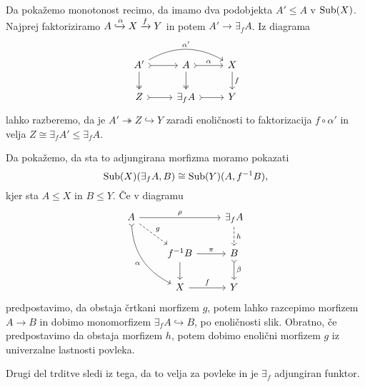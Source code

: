 \documentclass[../kategoricna_logika.tex]{subfiles}
\begin{document}
\begin{dokaz}
  Da pokažemo monotonost recimo, da imamo dva podobjekta $A' \leq A$ v
  $\operatorname{Sub}(X)$.  Najprej faktoriziramo
  $A \xhookrightarrow{\alpha} X \xrightarrow{f} Y$ in potem
  $A' \to \exists_f A$.  Iz diagrama
  \begin{equation*}
    \begin{tikzcd}
      A' \ar[d, two heads] \ar[r, tail] \ar[rr, bend left, "\alpha'"]
      &
      A \ar[d, two heads] \ar[r, tail, "\alpha"] & X \ar[d, "f"] \\
      Z \ar[r, tail] & \exists_f A \ar[r, tail] & Y
    \end{tikzcd}
  \end{equation*}
  lahko razberemo, da je $A' \twoheadrightarrow Z \hookrightarrow Y$
  zaradi enoličnosti to faktorizacija $f \circ \alpha'$ in velja
  $Z \cong \exists_f A' \leq \exists_f A$.

  Da pokažemo, da sta to adjungirana morfizma moramo pokazati
  $$\operatorname{Sub}(X)(\exists_f A, B) \cong \operatorname{Sub}(Y)(A, f^{-1}B),$$
  kjer sta $A \leq X$ in $B \leq Y$. Če v diagramu
  \begin{equation*}
    \begin{tikzcd}
      A \ar[ddr, bend right, tail, "\alpha"'] \ar[dr, dashed, "g"]
      \ar[rr, "\rho"] & &
      \exists_f A \ar[d, dashed, "h"] \\
      & f^{-1}B \ar[d] \ar[r, "\pi"] & B \ar[d, tail, "\beta"] \\
      & X \ar[r, "f"] & Y
    \end{tikzcd}
  \end{equation*}
  predpostavimo, da obstaja črtkani morfizem $g$, potem lahko
  razcepimo morfizem~$A \to B$ in dobimo monomorfizem
  $\exists_f A \hookrightarrow B$, po enoličnosti slik.  Obratno, če
  predpostavimo da obstaja morfizem $h$, potem dobimo enolični
  morfizem $g$ iz univerzalne lastnosti povleka.

  Drugi del trditve sledi iz tega, da to velja za povleke in je
  $\exists_f$ adjungiran funktor.
\end{dokaz}
%
\end{document}
